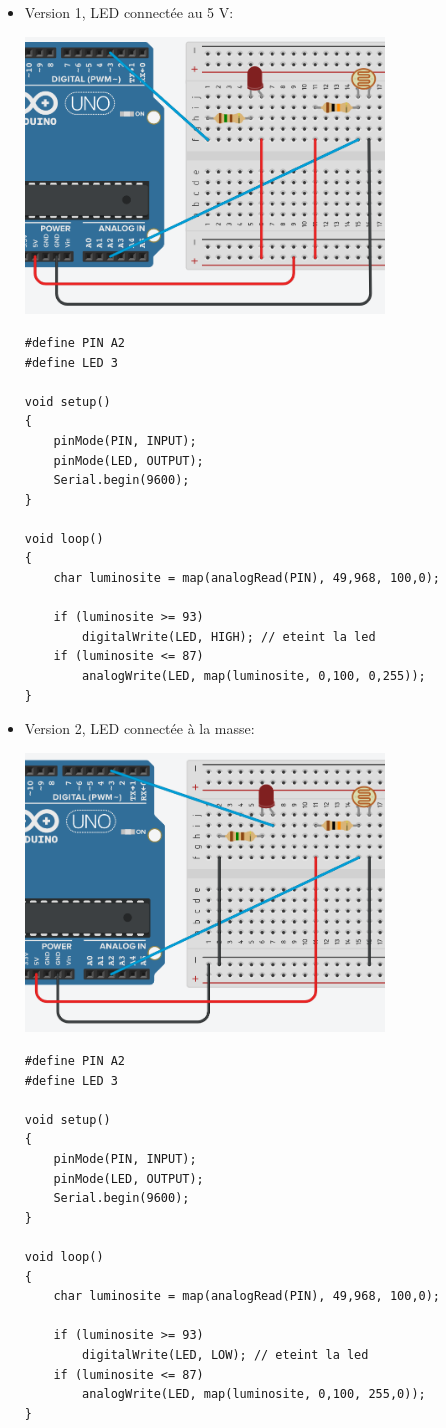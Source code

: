 \documentclass[a4paper]{article}
\begin{document}
\begin{itemize}
\item Version 1, LED connectée au 5 V:
\begin{center}
    \includegraphics[width=0.75\textwidth]{images/hysteresis-2.PNG}
\end{center}
\begin{lstlisting}[frame=single]
#define PIN A2
#define LED 3

void setup()
{
    pinMode(PIN, INPUT);
    pinMode(LED, OUTPUT);
    Serial.begin(9600);
}

void loop()
{
    char luminosite = map(analogRead(PIN), 49,968, 100,0);

    if (luminosite >= 93)
        digitalWrite(LED, HIGH); // eteint la led
    if (luminosite <= 87)
        analogWrite(LED, map(luminosite, 0,100, 0,255));
}
\end{lstlisting}
\item Version 2, LED connectée à la masse:
\begin{center}
    \includegraphics[width=0.75\textwidth]{images/hysteresis-3.PNG}
\end{center}
\begin{lstlisting}[frame=single]
#define PIN A2
#define LED 3

void setup()
{
    pinMode(PIN, INPUT);
    pinMode(LED, OUTPUT);
    Serial.begin(9600);
}

void loop()
{
    char luminosite = map(analogRead(PIN), 49,968, 100,0);

    if (luminosite >= 93)
        digitalWrite(LED, LOW); // eteint la led
    if (luminosite <= 87)
        analogWrite(LED, map(luminosite, 0,100, 255,0));
}    
\end{lstlisting}
\end{itemize}
\end{document}
